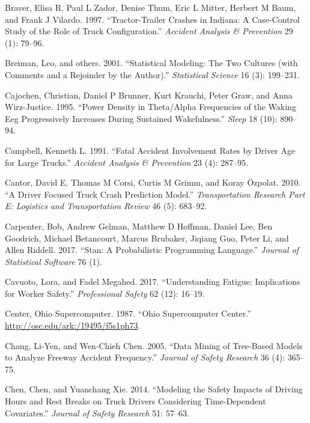 \documentclass[12pt]{book}
\numberwithin{equation}{chapter}
\begin{document}
\leavevmode\hypertarget{ref-braver1997tractor}{}%
Braver, Elisa R, Paul L Zador, Denise Thum, Eric L Mitter, Herbert M Baum, and Frank J Vilardo. 1997. ``Tractor-Trailer Crashes in Indiana: A Case-Control Study of the Role of Truck Configuration.'' \emph{Accident Analysis \& Prevention} 29 (1): 79--96.

\leavevmode\hypertarget{ref-breiman2001statistical}{}%
Breiman, Leo, and others. 2001. ``Statistical Modeling: The Two Cultures (with Comments and a Rejoinder by the Author).'' \emph{Statistical Science} 16 (3): 199--231.

\leavevmode\hypertarget{ref-cajochen1995power}{}%
Cajochen, Christian, Daniel P Brunner, Kurt Krauchi, Peter Graw, and Anna Wirz-Justice. 1995. ``Power Density in Theta/Alpha Frequencies of the Waking Eeg Progressively Increases During Sustained Wakefulness.'' \emph{Sleep} 18 (10): 890--94.

\leavevmode\hypertarget{ref-campbell1991fatal}{}%
Campbell, Kenneth L. 1991. ``Fatal Accident Involvement Rates by Driver Age for Large Trucks.'' \emph{Accident Analysis \& Prevention} 23 (4): 287--95.

\leavevmode\hypertarget{ref-cantor2010driver}{}%
Cantor, David E, Thomas M Corsi, Curtis M Grimm, and Koray Özpolat. 2010. ``A Driver Focused Truck Crash Prediction Model.'' \emph{Transportation Research Part E: Logistics and Transportation Review} 46 (5): 683--92.

\leavevmode\hypertarget{ref-carpenter2017stan}{}%
Carpenter, Bob, Andrew Gelman, Matthew D Hoffman, Daniel Lee, Ben Goodrich, Michael Betancourt, Marcus Brubaker, Jiqiang Guo, Peter Li, and Allen Riddell. 2017. ``Stan: A Probabilistic Programming Language.'' \emph{Journal of Statistical Software} 76 (1).

\leavevmode\hypertarget{ref-cavuoto2017understanding}{}%
Cavuoto, Lora, and Fadel Megahed. 2017. ``Understanding Fatigue: Implications for Worker Safety.'' \emph{Professional Safety} 62 (12): 16--19.

\leavevmode\hypertarget{ref-OSC1987}{}%
Center, Ohio Supercomputer. 1987. ``Ohio Supercomputer Center.'' \url{http://osc.edu/ark:/19495/f5s1ph73}.

\leavevmode\hypertarget{ref-chang2005data}{}%
Chang, Li-Yen, and Wen-Chieh Chen. 2005. ``Data Mining of Tree-Based Models to Analyze Freeway Accident Frequency.'' \emph{Journal of Safety Research} 36 (4): 365--75.

\leavevmode\hypertarget{ref-chen2014modeling}{}%
Chen, Chen, and Yuanchang Xie. 2014. ``Modeling the Safety Impacts of Driving Hours and Rest Breaks on Truck Drivers Considering Time-Dependent Covariates.'' \emph{Journal of Safety Research} 51: 57--63.
\end{document}
